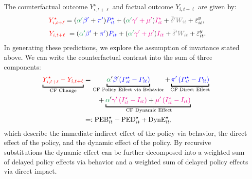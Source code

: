 \documentclass[3p, longtitle]{elsarticle}
\theoremstyle{definition}
\def\bcolor{\color{ForestGreen}}
\def\pcolor{\color{blue}}
\def\icolor{\color{magenta}}
\def\wcolor{\color{gray}}
\def\ycolor{\color{red}}
\begin{document}
The counterfactual outcome $Y^\star_{i,t+\ell}$  and  factual outcome $Y_{i,t+\ell}$  are given by:
$$
 {\ycolor Y^\star_{i,t+\ell}} = ( {\bcolor\alpha '} {\pcolor \beta'}  + {\pcolor\pi'})
    {\pcolor P^\star_{it}} + ({\bcolor\alpha '}  {\icolor \gamma' + \mu'})
    {\icolor I^\star_{it} }+ {\wcolor \bar \delta 'W_{it}} + \bar \varepsilon_{it}^y, $$$$\ {\ycolor Y_{i,t+\ell}} \ =
    ( {\bcolor\alpha '}  {\pcolor \beta'} + {\pcolor\pi'})
    {\pcolor P_{it}} + ({\bcolor\alpha '}  {\icolor \gamma' + \mu'})
    {\icolor I_{it} }+ {\wcolor \bar \delta 'W_{it}} + \bar \varepsilon_{it}^y.
$$
In generating these predictions, we explore the assumption of invariance stated above.
We can write  the counterfactual contrast into the sum of three components:
  \begin{align}
 \underbracket{{\ycolor Y^\star_{i,t+\ell} -  Y_{i,t+\ell} }}_{\text{CF Change}} & =
\underbracket{{\bcolor\alpha}' {\pcolor\beta}' {\pcolor\left(P^\star_{it} - P_{it} \right)}}_{\text{CF Policy Effect via Behavior}}  +    {\underbracket{\pcolor\pi' \left( P^\star_{it} -  P_{it} \right)}_{\text{CF Direct  Effect}} } \nonumber\\
&\qquad +  {\underbracket{{\bcolor\alpha}' {\icolor{\gamma}'  \left( I^\star_{it} - I_{it} \right)}+ {\icolor{\mu}'  \left( I^\star_{it} -  I_{it} \right)}}_{\text{ CF Dynamic Effect}}} \nonumber \\
 & =:   \mathrm{PEB}^\star_{it} + \mathrm{PED}^\star_{it} + \mathrm{DynE}^\star_{it}, \label{eqn:DC2}
  \end{align}
 which describe the immediate indirect effect of the policy via behavior, the direct effect of the policy, and the dynamic effect
 of the policy.  By recursive substitutions the dynamic effect  can be further decomposed into a weighted sum of delayed policy effects via behavior and a weighted sum of delayed policy effects via direct impact.


\end{document}
